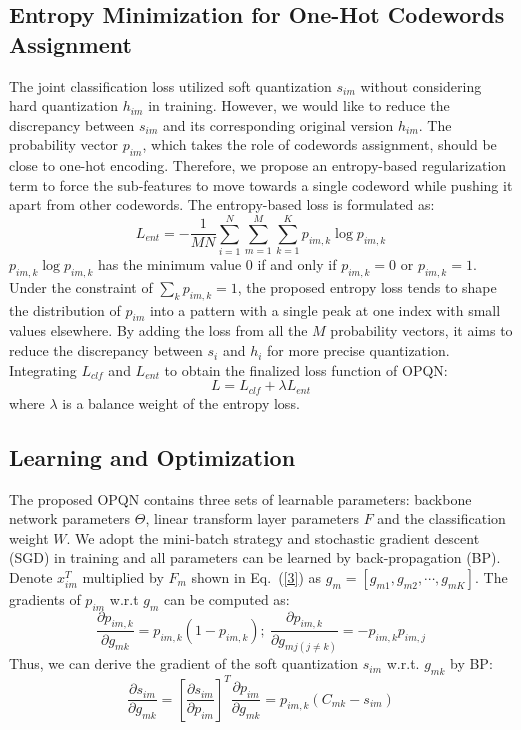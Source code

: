 \documentclass{elsarticle}
\begin{document}
\subsection{Entropy Minimization for One-Hot Codewords Assignment}
The joint classification loss utilized soft quantization $s_{im}$ without considering hard quantization $h_{im}$ in training. However, we would like to reduce the discrepancy between $s_{im}$ and its corresponding original version $h_{im}$. The probability vector $p_{im}$, which takes the role of codewords assignment, should be close to one-hot encoding. Therefore, we propose an entropy-based regularization term to force the sub-features to move towards a single codeword while pushing it apart from other codewords. The entropy-based loss is formulated as:
\begin{equation} \label{10}
    L_{ent} = -\frac{1}{MN}\sum_{i=1}^{N} \sum_{m=1}^{M} \sum_{k=1}^{K} p_{im,k}\log{p_{im,k}} 
\end{equation}
$p_{im,k}\log{p_{im,k}}$ has the minimum value 0 if and only if $p_{im,k}=0$ or $p_{im,k}=1$. Under the constraint of $\sum_k p_{im,k}=1$, the proposed entropy loss tends to shape the distribution of $p_{im}$ into a pattern with a single peak at one index with small values elsewhere. By adding the loss from all the $M$ probability vectors, it aims to reduce the discrepancy between $s_{i}$ and $h_{i}$ for more precise quantization. Integrating $L_{clf}$ and $L_{ent}$ to obtain the finalized loss function of OPQN:
\begin{equation} \label{11}
   L = L_{clf} + \lambda L_{ent}
\end{equation}
where $\lambda$ is a balance weight of the entropy loss.

\subsection{Learning and Optimization}
The proposed OPQN contains three sets of learnable parameters: backbone network parameters $\Theta$, linear transform layer parameters $F$ and the classification weight $W$. We adopt the mini-batch strategy and stochastic gradient descent (SGD) in training and all parameters can be learned by back-propagation (BP). Denote $x_{im}^T$ multiplied by $F_{m}$ shown in Eq.~(\ref{3}) as $g_{m}=[g_{m1}, g_{m2}, \cdots, g_{mK}]$. The gradients of $p_{im}$ w.r.t $g_{m}$ can be computed as:
\begin{equation} \label{12}
  \frac{\partial p_{im,k}}{\partial g_{mk}} = p_{im,k}(1-p_{im,k}); \: \frac{\partial p_{im,k}}{\partial g_{mj (j \neq k)}} = -p_{im,k}p_{im,j} 
\end{equation}
Thus, we can derive the gradient of the soft quantization $s_{im}$ w.r.t. $g_{mk}$ by BP:
\begin{equation} \label{13}
  \frac{\partial s_{im}}{\partial g_{mk}} = \left [\frac{\partial s_{im}}{\partial p_{im}} \right]^T \frac{\partial p_{im}}{\partial g_{mk}} = p_{im,k}(C_{mk}-s_{im})
\end{equation}
\end{document}
